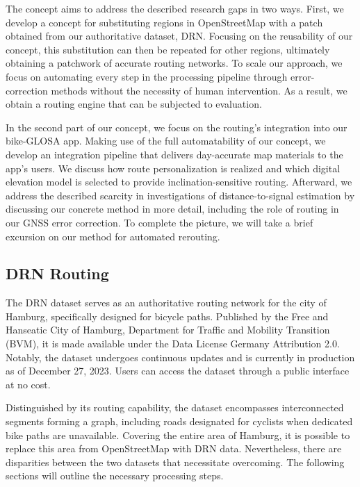 The concept aims to address the described research gaps in two ways. First, we develop a concept for substituting regions in OpenStreetMap with a patch obtained from our authoritative dataset, DRN. Focusing on the reusability of our concept, this substitution can then be repeated for other regions, ultimately obtaining a patchwork of accurate routing networks. To scale our approach, we focus on automating every step in the processing pipeline through error-correction methods without the necessity of human intervention. As a result, we obtain a routing engine that can be subjected to evaluation.

In the second part of our concept, we focus on the routing's integration into our bike-GLOSA app. Making use of the full automatability of our concept, we develop an integration pipeline that delivers day-accurate map materials to the app's users. We discuss how route personalization is realized and which digital elevation model is selected to provide inclination-sensitive routing. Afterward, we address the described scarcity in investigations of distance-to-signal estimation by discussing our concrete method in more detail, including the role of routing in our GNSS error correction. To complete the picture, we will take a brief excursion on our method for automated rerouting.

\subsection{DRN Routing}

The DRN dataset serves as an authoritative routing network for the city of Hamburg, specifically designed for bicycle paths. Published by the Free and Hanseatic City of Hamburg, Department for Traffic and Mobility Transition (BVM), it is made available under the Data License Germany Attribution 2.0. Notably, the dataset undergoes continuous updates and is currently in production as of December 27, 2023. Users can access the dataset through a public interface at no cost. 

Distinguished by its routing capability, the dataset encompasses interconnected segments forming a graph, including roads designated for cyclists when dedicated bike paths are unavailable. Covering the entire area of Hamburg, it is possible to replace this area from OpenStreetMap with DRN data. Nevertheless, there are disparities between the two datasets that necessitate overcoming. The following sections will outline the necessary processing steps.

